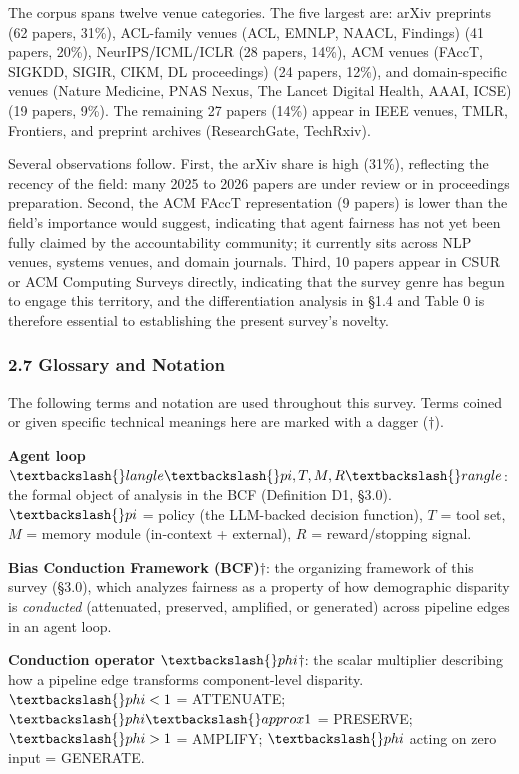 \documentclass[10pt]{article}
\begin{document}
The corpus spans twelve venue categories. The five largest are: arXiv preprints (62 papers, 31\%), ACL-family venues (ACL, EMNLP, NAACL, Findings) (41 papers, 20\%), NeurIPS/ICML/ICLR (28 papers, 14\%), ACM venues (FAccT, SIGKDD, SIGIR, CIKM, DL proceedings) (24 papers, 12\%), and domain-specific venues (Nature Medicine, PNAS Nexus, The Lancet Digital Health, AAAI, ICSE) (19 papers, 9\%). The remaining 27 papers (14\%) appear in IEEE venues, TMLR, Frontiers, and preprint archives (ResearchGate, TechRxiv).

Several observations follow. First, the arXiv share is high (31\%), reflecting the recency of the field: many 2025 to 2026 papers are under review or in proceedings preparation. Second, the ACM FAccT representation (9 papers) is lower than the field's importance would suggest, indicating that agent fairness has not yet been fully claimed by the accountability community; it currently sits across NLP venues, systems venues, and domain journals. Third, 10 papers appear in CSUR or ACM Computing Surveys directly, indicating that the survey genre has begun to engage this territory, and the differentiation analysis in \S{}1.4 and Table 0 is therefore essential to establishing the present survey's novelty.


\subsubsection*{2.7 Glossary and Notation}

The following terms and notation are used throughout this survey. Terms coined or given specific technical meanings here are marked with a dagger ($\dagger$).

\textbf{Agent loop} $\textbackslash\{\}langle \textbackslash\{\}pi, T, M, R \textbackslash\{\}rangle$: the formal object of analysis in the BCF (Definition D1, \S{}3.0). $\textbackslash\{\}pi$ = policy (the LLM-backed decision function), $T$ = tool set, $M$ = memory module (in-context + external), $R$ = reward/stopping signal.

\textbf{Bias Conduction Framework (BCF)$\dagger$}: the organizing framework of this survey (\S{}3.0), which analyzes fairness as a property of how demographic disparity is \emph{conducted} (attenuated, preserved, amplified, or generated) across pipeline edges in an agent loop.

\textbf{Conduction operator $\textbackslash\{\}phi$$\dagger$}: the scalar multiplier describing how a pipeline edge transforms component-level disparity. $\textbackslash\{\}phi < 1$ = ATTENUATE; $\textbackslash\{\}phi \textbackslash\{\}approx 1$ = PRESERVE; $\textbackslash\{\}phi > 1$ = AMPLIFY; $\textbackslash\{\}phi$ acting on zero input = GENERATE.
\end{document}
